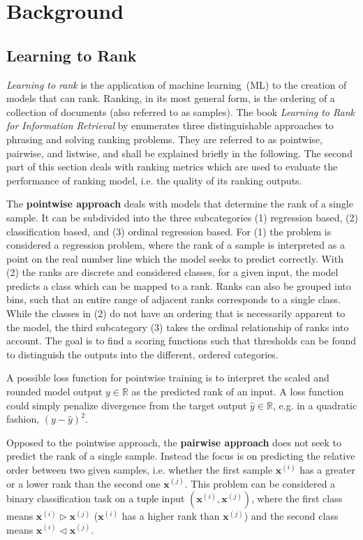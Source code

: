 \section{Background}
\label{sec:background}

\subsection{Learning to Rank}
\label{sec:learningtorank}

\textit{Learning to rank} is the application of machine learning (ML) to the creation of models that can rank. Ranking, in its most general form, is the ordering of a collection of documents (also referred to as samples). The book \textit{Learning to Rank for Information Retrieval} by \citeauthor{liu2009learningtorank} \cite{liu2009learningtorank} enumerates three distinguishable approaches to phrasing and solving ranking problems. They are referred to as pointwise, pairwise, and listwise, and shall be explained briefly in the following. The second part of this section deals with ranking metrics which are used to evaluate the performance of ranking model, i.e. the quality of its ranking outputs.

The \textbf{pointwise approach} deals with models that determine the rank of a single sample. It can be subdivided into the three subcategories (1) regression based, (2) classification based, and (3) ordinal regression based. For (1) the problem is considered a regression problem, where the rank of a sample is interpreted as a point on the real number line which the model seeks to predict correctly. With (2) the ranks are discrete and considered classes, for a given input, the model predicts a class which can be mapped to a rank. Ranks can also be grouped into bins, such that an entire range of adjacent ranks corresponds to a single class. While the classes in (2) do not have an ordering that is necessarily apparent to the model, the third subcategory (3) takes the ordinal relationship of ranks into account. The goal is to find a scoring functions such that thresholds can be found to distinguish the outputs into the different, ordered categories.

A possible loss function for pointwise training is to interpret the scaled and rounded model output $y\in\mathbb{R}$ as the predicted rank of an input. A loss function could simply penalize divergence from the target output $\hat{y}\in\mathbb{R}$, e.g. in a quadratic fashion, $(y-\hat{y})^2$.

Opposed to the pointwise approach, the \textbf{pairwise approach} does not seek to predict the rank of a single sample. Instead the focus is on predicting the relative order between two given samples, i.e. whether the first sample $\bm{x}^{(i)}$ has a greater or a lower rank than the second one $\bm{x}^{(j)}$. This problem can be considered a binary classification task on a tuple input $(\bm{x}^{(i)},\bm{x}^{(j)})$, where the first class means $\bm{x}^{(i)}\triangleright \bm{x}^{(j)}$ ($\bm{x}^{(i)}$ has a higher rank than $\bm{x}^{(j)}$) and the second class means $\bm{x}^{(i)}\triangleleft \bm{x}^{(j)}$.

